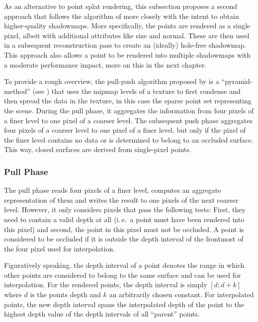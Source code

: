 As an alternative to point splat rendering, this subsection proposes a second approach that follows the algorithm of \cite{Marroquim:2007:reconstruction} more closely with the intent to obtain higher-quality shadowmaps. More specifically, the points are rendered as a single pixel, albeit with additional attributes like size and normal. These are then used in a subsequent reconstruction pass to create an (ideally) hole-free shadowmap. This approach also allows a point to be rendered into multiple shadowmaps with a moderate performance impact, more on this in the next chapter.

To provide a rough overview, the pull-push algorithm proposed by \cite{Marroquim:2007:reconstruction} is a ``pyramid-method'' (see \cite{Strengert:2006:Pyramid}) that uses the mipmap levels of a texture to first condense and then spread the data in the texture, in this case the sparse point set representing the scene. During the pull phase, it aggregates the information from four pixels of a finer level to one pixel of a coarser level. The subsequent push phase aggregates four pixels of a coarser level to one pixel of a finer level, but only if the pixel of the finer level contains no data or is determined to belong to an occluded surface. This way, closed surfaces are derived from single-pixel points.

\subsubsection{Pull Phase}
The pull phase reads four pixels of a finer level, computes an aggregate representation of them and writes the result to one pixels of the next coarser level. However, it only considers pixels that pass the following tests: First, they need to contain a valid depth at all (i.\,e.\ a point must have been rendered into this pixel) and second, the point in this pixel must not be occluded. A point is considered to be occluded if it is outside  the depth interval of the frontmost of the four pixel used for interpolation.

Figuratively speaking, the depth interval of a point denotes the range in which other points are considered to belong to the same surface and can be used for interpolation. For the rendered points, the depth interval is simply $[d;d+k]$ where $d$ is the points depth and $k$ an arbitrarily chosen constant. For interpolated points, the new depth interval spans the interpolated depth of the point to the highest depth value of the depth intervals of all ``parent'' points.

